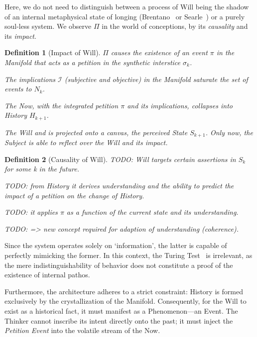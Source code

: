 \documentclass[11pt, a4paper]{article}
\theoremstyle{formalism}
\newtheorem{formalism}{Definition}
\begin{document}
{Here, we do not need to distinguish between a process of Will being the shadow
of an internal metaphysical state of longing (Brentano~\cite{Brentano1874} or
Searle~\cite{Searle1983}) or a purely soul-less system. We observe $\Pi$ in
the world of conceptions, by its {\it causality\/} and its {\it impact}.

\begin{formalism}[Impact of Will]
\item $\Pi$ causes the existence of an event $\pi$ in the Manifold that 
    acts as a {\it petition\/} in the synthetic interstice $\sigma_k$.
\item The implications $\mathcal{I}$ (subjective and objective) in the 
    Manifold saturate the set of events to $N_k$.
\item The Now, with the integrated petition $\pi$ and its implications, 
    collapses into History $H_{k+1}$.
\item The Will and is projected onto a canvas, the perceived State $S_{k+1}$. 
    Only now, the Subject is able to reflect over the Will and its impact. 
\end{formalism}

\begin{formalism}[Causality of Will]
\item TODO: Will targets certain assertions in $S_k$ for some k in the future. 
\item TODO: from History it derives understanding and the ability to predict the impact of a petition on the change of History.
\item TODO: it applies $\pi$ as a function of the current state and its understanding.
\item TODO: => new concept required for adaption of understanding (coherence).
\end{formalism}

Since the system operates solely on `information', the latter is capable of
perfectly mimicking the former. In this context, the Turing
Test~\cite{Turing1950} is irrelevant, as the mere indistinguishability of
behavior does not constitute a proof of the existence of internal pathos.

Furthermore, the architecture adheres to a strict constraint: History is formed
exclusively by the crystallization of the Manifold. Consequently, for the Will to
exist as a historical fact, it must manifest as a Phenomenon---an Event. The
Thinker cannot inscribe its intent directly onto the past; it must inject the
\textit{Petition Event} into the volatile stream of the Now.

}
\end{document}
